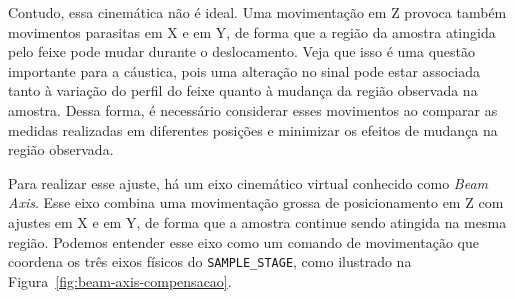 \documentclass[12pt,a4paper]{article}
\begin{document}
Contudo, essa cinemática não é ideal. Uma movimentação em Z provoca também movimentos parasitas em X e em Y, de forma que a região da amostra atingida pelo feixe pode mudar durante o deslocamento. Veja que isso é uma questão importante para a cáustica, pois uma alteração no sinal pode estar associada tanto à variação do perfil do feixe quanto à mudança da região observada na amostra. Dessa forma, é necessário considerar esses movimentos ao comparar as medidas realizadas em diferentes posições e minimizar os efeitos de mudança na região observada.

Para realizar esse ajuste, há um eixo cinemático virtual conhecido como \textit{Beam Axis}. Esse eixo combina uma movimentação grossa de posicionamento em Z com ajustes em X e em Y, de forma que a amostra continue sendo atingida na mesma região. Podemos entender esse eixo como um comando de movimentação que coordena os três eixos físicos do \texttt{SAMPLE\_STAGE}, como ilustrado na Figura~\ref{fig:beam-axis-compensacao}.
\end{document}
